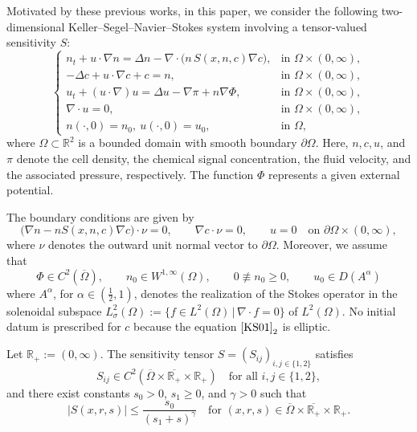 \documentclass{amsart}
\numberwithin{equation}{section}
\begin{document}
Motivated by these previous works, in this paper, we consider the following two-dimensional Keller--Segel--Navier--Stokes system involving a tensor-valued sensitivity $S$:
\begin{equation}\label{KS01}
\begin{cases}
n_t + u\cdot\nabla n = \Delta n - \nabla\cdot\bigl(n\,S(x,n,c)\nabla c\bigr), & \text{in } \Omega\times(0,\infty),\\
-\Delta c + u\cdot\nabla c + c = n, & \text{in } \Omega\times(0,\infty),\\
u_t + (u\cdot\nabla)u = \Delta u - \nabla\pi + n\nabla\Phi, & \text{in } \Omega\times(0,\infty),\\
\nabla\cdot u = 0, & \text{in } \Omega\times(0,\infty), \\
n(\cdot, 0)=n_0, \ u(\cdot, 0)=u_0, & \text{in } \Omega,
\end{cases}
\end{equation}
where $\Omega\subset\mathbb{R}^{2}$ is a bounded domain with smooth boundary $\partial\Omega$. 
Here, $n, c, u$, and $\pi$ denote the cell density, the chemical signal concentration, the fluid velocity, and the associated pressure, respectively. The function $\Phi$ represents a given external potential.

The boundary conditions are given by 
\begin{equation}\label{KS_boundary}
\bigl(\nabla n - n S(x,n,c)\nabla c\bigr)\cdot \nu =0, \qquad \nabla c \cdot \nu  = 0, \qquad u=0 \quad \text{on } \partial\Omega \times (0,\infty),
\end{equation}
where $\nu$ denotes the outward unit normal vector to $\partial \Omega$. Moreover, we assume that 
\begin{equation}\label{KS03}
\Phi\in C^{2}(\overline{\Omega}),\qquad n_0\in W^{1,\infty}(\Omega),\qquad 0 \not\equiv n_0\ge 0, \qquad u_0\in D(A^{\alpha})
\end{equation}
where $A^{\alpha}$, for $\alpha \in (\frac12,1)$, denotes the realization of the Stokes operator in the solenoidal subspace $L^{2}_{\sigma}(\Omega):= \bigl\{f\in L^{2}(\Omega)\,\big|\, \nabla \cdot f=0 \bigr\}$ of $L^{2}(\Omega)$. No initial datum is prescribed for $c$ because the equation $\eqref{KS01}_{2}$ is elliptic.

Let $\mathbb{R}_{+}:=(0,\infty)$. The sensitivity tensor $S=(S_{ij})_{i,j\in\{1,2\}}$ satisfies
\begin{equation}\label{KS_S}
S_{ij}\in C^{2}(\overline{\Omega}\times \overline{\mathbb{R}_{+}}\times \mathbb{R}_{+} )\quad \text{for all } i,j\in\{1,2\}, 
\end{equation}
and there exist constants $s_0>0$, $s_1\ge 0$, and $\gamma>0$ such that
\begin{equation}\label{KS02}
|S(x,r,s)| \le \frac{s_{0}}{(s_1+s)^{\gamma}} \quad \text{for } (x,r,s)\in \overline{\Omega}\times \overline{\mathbb{R}_{+}}\times \mathbb{R}_{+}.    
\end{equation}
\end{document}

